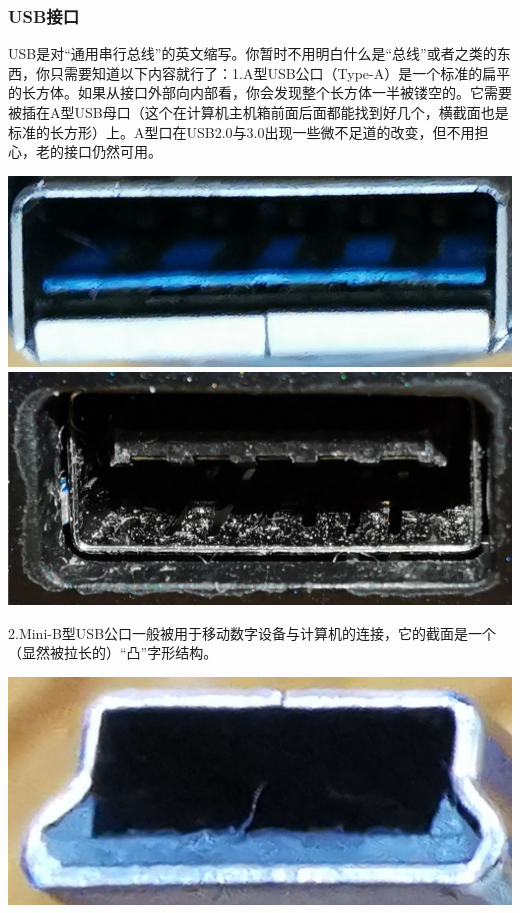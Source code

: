 \subsubsection{USB接口}
USB是对“通用串行总线”的英文缩写。你暂时不用明白什么是“总线”或者之类的东西，你只需要知道以下内容就行了：1.A型USB公口（Type-A）是一个标准的扁平的长方体。如果从接口外部向内部看，你会发现整个长方体一半被镂空的。它需要被插在A型USB母口（这个在计算机主机箱前面后面都能找到好几个，横截面也是标准的长方形）上。A型口在USB2.0与3.0出现一些微不足道的改变，但不用担心，老的接口仍然可用。
\begin{center}
	\includegraphics[scale=0.3]{pic/A-USB-1}\includegraphics[scale=0.1]{pic/A-USB-2}
\end{center}\par
2.Mini-B型USB公口一般被用于移动数字设备与计算机的连接，它的截面是一个（显然被拉长的）“凸”字形结构。
\begin{center}
	\includegraphics[scale=0.1]{pic/Mini-USB-B-1}
\end{center}\par
